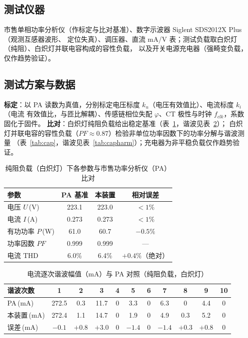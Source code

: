 \documentclass[12pt]{article}
\newcommand{\wuhao}{\fontsize{10.5pt}{15pt}\selectfont}
\begin{document}
\subsection{测试仪器}
市售单相功率分析仪（作标定与比对基准）、数字示波器 Siglent SDS2012X Plus（观测互感器波形、
定位失真）、调压器、直流 mA/V 表；测试负载取白炽灯（纯阻）、白炽灯并联电容构成的容性负载，
以及开关电源充电器（强畸变负载，仅作趋势验证）。

\subsection{测试方案与数据}
\textbf{标定}：以 PA 读数为真值，分别标定电压标度 $k_u$（电压有效值比）、电流标度 $k_i$（电流
有效值比，与匝比解耦）、传感链相位失配 $\varphi$、CT 极性与时钟 $f_{clk}$，系数固化于固件。
\textbf{比对}：白炽灯纯阻负载给出稳定基准（表~\ref{tab:acc}，谐波见表~\ref{tab:harm}）；
白炽灯并联电容的容性负载（$PF\approx0.87$）检验非单位功率因数下的功率分解与谐波测量
（表~\ref{tab:cap}，谐波见表~\ref{tab:capharm}）；充电器为非平稳负载仅作趋势验证。

\begin{table}[htbp]\centering
\caption{纯阻负载（白炽灯）下各参数与市售功率分析仪（PA）比对}
\label{tab:acc}
\wuhao
\begin{tabular}{lccc}
\toprule
参数 & PA 基准 & 本装置 & 相对误差\\
\midrule
电压 $U$\,(V)      & 223.1  & 223.0 & $<1\%$\\
电流 $I$\,(A)      & 0.273  & 0.273 & $<1\%$\\
有功功率 $P$\,(W)  & 61.0   & 60.7  & $-0.5\%$\\
功率因数 $PF$      & 0.999  & 0.999 & ---\\
电流 THD          & 6.0\%  & 6.4\% & $+0.4\%$（绝对）\\
\bottomrule
\end{tabular}
\end{table}

\begin{table}[htbp]\centering
\caption{电流逐次谐波幅值（mA）与 PA 对照（纯阻负载，白炽灯）}
\label{tab:harm}
\wuhao
\begin{tabular}{lcccccccccc}
\toprule
谐波次数 & 1 & 2 & 3 & 4 & 5 & 6 & 7 & 8 & 9 & 10\\
\midrule
PA\,(mA)    & 272.5 & 0.3 & 11.7 & 0 & 3.3 & 0 & 6.3 & 0   & 4.4 & 0\\
本装置\,(mA) & 272.4 & 1.1 & 14.7 & 0 & 1.9 & 0 & 4.9 & 0.3 & 5.2 & 0\\
误差\,(mA)   & $-0.1$ & $+0.8$ & $+3.0$ & 0 & $-1.4$ & 0 & $-1.4$ & $+0.3$ & $+0.8$ & 0\\
\bottomrule
\end{tabular}

\vspace{2pt}
\end{table}
\end{document}
